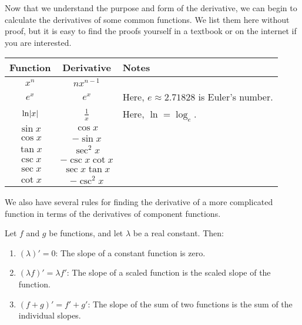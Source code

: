 



Now that we understand the purpose and form of the derivative, we can begin to calculate
the derivatives of some common functions. We list them here without proof, but it is easy
to find the proofs yourself in a textbook or on the internet if you are interested.

\begin{center}
  \def\arraystretch{1.5}
  \begin{tabular}{|c|c|l|}\hline
    \textbf{Function} & \textbf{Derivative} & \textbf{Notes}\\\hline
    $ x^n $ & $ nx^{n - 1} $&\\\hline
    $ e^x $ & $ e^x $ & Here, $ e \approx 2.71828 $ is Euler's number. \\\hline
    $ \ln \abs{x} $ & $ \frac{1}{x} $ & Here, $ \ln = \log_e $. \\\hline
    $ \sin x $ & $ \cos x $&\\\hline
    $ \cos x $ & $ -\sin x $&\\\hline
    $ \tan x $ & $ \sec^2 x $&\\\hline
    $ \csc x $ & $ -\csc x \cot x $&\\\hline
    $ \sec x $ & $ \sec x \tan x $&\\\hline
    $ \cot x $ & $ -\csc^2 x $&\\\hline
  \end{tabular}
\end{center}

We also have several rules for finding the derivative of a more complicated function in terms of the derivatives of component
functions.

\begin{thm}
  Let $ f $ and $ g $ be functions, and let $ \lambda $ be a real constant. Then:
  \begin{enumerate}
    \item $ (\lambda)' = 0 $: The slope of a constant function is zero.
    \item $ (\lambda f)' = \lambda f' $: The slope of a scaled function is the scaled slope of the function.
    \item $ (f + g)' = f' + g' $: The slope of the sum of two functions is the sum of the individual slopes.
  \end{enumerate}
\end{thm}

